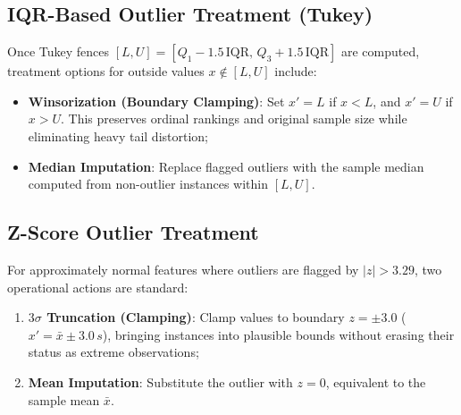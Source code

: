 \subsection{IQR-Based Outlier Treatment (Tukey)}
Once Tukey fences $[L, U] = [Q_1 - 1.5\,\text{IQR}, \, Q_3 + 1.5\,\text{IQR}]$ are computed, treatment options for outside values $x \notin [L, U]$ include:
\begin{itemize}
    \item \textbf{Winsorization (Boundary Clamping)}: Set $x' = L$ if $x < L$, and $x' = U$ if $x > U$. This preserves ordinal rankings and original sample size while eliminating heavy tail distortion;
    \item \textbf{Median Imputation}: Replace flagged outliers with the sample median computed from non-outlier instances within $[L, U]$.
\end{itemize}

\subsection{Z-Score Outlier Treatment}
For approximately normal features where outliers are flagged by $|z| > 3.29$, two operational actions are standard:
\begin{enumerate}
    \item \textbf{$3\sigma$ Truncation (Clamping)}: Clamp values to boundary $z = \pm 3.0$ ($x' = \bar{x} \pm 3.0\,s$), bringing instances into plausible bounds without erasing their status as extreme observations;
    \item \textbf{Mean Imputation}: Substitute the outlier with $z = 0$, equivalent to the sample mean $\bar{x}$.
\end{enumerate}
